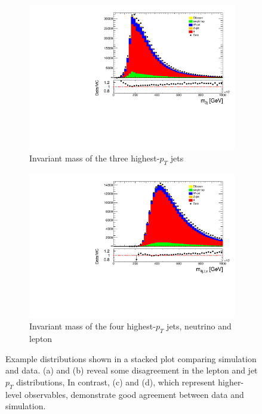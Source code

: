 \begin{figure}[H]
    \begin{subfigure}[b]{0.48\textwidth}
        \centering
        \includegraphics[width=\textwidth]{Figure/h_mc_invM3jet_stacked.pdf}
        \caption{Invariant mass of the three highest-\(p_T\) jets}
        \label{fig:plot_high_c}
    \end{subfigure}
    \hfill
    \begin{subfigure}[b]{0.48\textwidth}
        \centering
        \includegraphics[width=\textwidth]{Figure/h_four_jet_lep_neutrino_inv_mass.pdf}
        \caption{Invariant mass of the four highest-\(p_T\) jets, neutrino and lepton}
        \label{fig:plot_high_d}
    \end{subfigure}

    \caption{Example distributions shown in a stacked plot comparing simulation and data. (a) and (b) reveal some disagreement in the lepton and jet \(p_T\) distributions, In contrast, (c) and (d), which represent higher-level observables, demonstrate good agreement between data and simulation.}
    \label{fig:plot_stack}
\end{figure}


